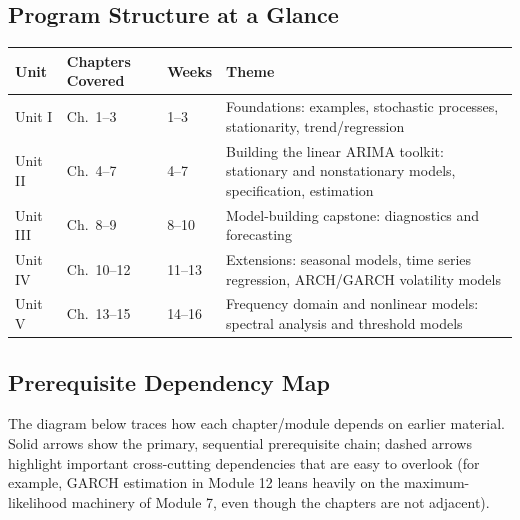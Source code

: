 \documentclass[11pt]{article}
\begin{document}
\subsection{Program Structure at a Glance}
\begin{longtable}{@{}p{2.7cm}p{3.9cm}p{2.0cm}p{6.0cm}@{}}
\toprule
\textbf{Unit} & \textbf{Chapters Covered} & \textbf{Weeks} & \textbf{Theme} \\
\midrule
\endhead
Unit I & Ch.\ 1--3 & 1--3 & Foundations: examples, stochastic processes, stationarity, trend/regression \\
Unit II & Ch.\ 4--7 & 4--7 & Building the linear ARIMA toolkit: stationary and nonstationary models, specification, estimation \\
Unit III & Ch.\ 8--9 & 8--10 & Model-building capstone: diagnostics and forecasting \\
Unit IV & Ch.\ 10--12 & 11--13 & Extensions: seasonal models, time series regression, ARCH/GARCH volatility models \\
Unit V & Ch.\ 13--15 & 14--16 & Frequency domain and nonlinear models: spectral analysis and threshold models \\
\bottomrule
\end{longtable}

\subsection{Prerequisite Dependency Map}
The diagram below traces how each chapter/module depends on earlier material. Solid arrows show the primary, sequential prerequisite chain; dashed arrows highlight important cross-cutting dependencies that are easy to overlook (for example, GARCH estimation in Module 12 leans heavily on the maximum-likelihood machinery of Module 7, even though the chapters are not adjacent).
\end{document}
